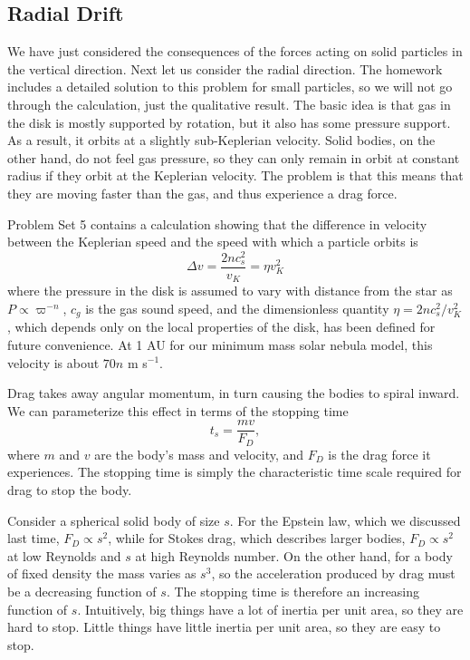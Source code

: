 \subsection{Radial Drift}

We have just considered the consequences of the forces acting on solid particles in the vertical direction. Next let us consider the radial direction. The homework includes a detailed solution to this problem for small particles, so we will not go through the calculation, just the qualitative result. The basic idea is that gas in the disk is mostly supported by rotation, but it also has some pressure support. As a result, it orbits at a slightly sub-Keplerian velocity. Solid bodies, on the other hand, do not feel gas pressure, so they can only remain in orbit at constant radius if they orbit at the Keplerian velocity. The problem is that this means that they are moving faster than the gas, and thus experience a drag force.

Problem Set 5 contains a calculation showing that the difference in velocity between the Keplerian speed and the speed with which a particle orbits is
\begin{equation}
\Delta v = \frac{2n c_s^2}{v_K} = \eta v_K^2
\end{equation}
where the pressure in the disk is assumed to vary with distance from the star as $P\propto \varpi^{-n}$, $c_g$ is the gas sound speed, and the dimensionless quantity $\eta = 2 n c_s^2/v_K^2$, which depends only on the local properties of the disk, has been defined for future convenience. At 1 AU for our minimum mass solar nebula model, this velocity is about $70 n$ m s$^{-1}$.

Drag takes away angular momentum, in turn causing the bodies to spiral inward. We can parameterize this effect in terms of the stopping time 
\begin{equation}
t_s = \frac{mv}{F_D},
\end{equation}
where $m$ and $v$ are the body's mass and velocity, and $F_D$ is the drag force it experiences. The stopping time is simply the characteristic time scale required for drag to stop the body.

Consider a spherical solid body of size $s$. For the Epstein law, which we discussed last time, $F_D \propto s^2$, while for Stokes drag, which describes larger bodies, $F_D \propto s^2$ at low Reynolds and $s$ at high Reynolds number. On the other hand, for a body of fixed density the mass varies as $s^3$, so the acceleration produced by drag must be a decreasing function of $s$. The stopping time is therefore an increasing function of $s$. Intuitively, big things have a lot of inertia per unit area, so they are hard to stop. Little things have little inertia per unit area, so they are easy to stop.

